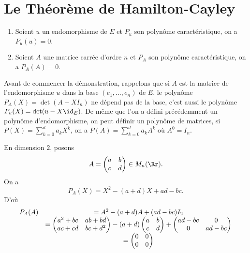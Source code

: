 \documentclass[class=report,crop=false]{standalone}
\begin{document}
\section{Le Théorème de Hamilton-Cayley}

\begin{theoreme}
\begin{enumerate}
  \item Soient $u$ un endomorphisme de $E$ et $P_u$ son polynôme caractéristique, on a
$P_u(u)=0$.
  \item Soient $A$ une matrice carrée d'ordre $n$ et $P_A$ son polynôme caractéristique, on a
$P_A(A)=0$.
\end{enumerate}
\end{theoreme}


Avant de commencer la démonstration, rappelons que si $A$ est la matrice de 
l'endomorphisme $u$ dans la base $(e_1,\dots,e_n)$ de $E$, 
le polynôme $P_A(X)=\det(A-XI_n)$ ne dépend pas de la base, c'est aussi le 
polynôme $P_u(X)=\det(u-X\id_E)$. De même que l'on a défini précédemment un 
polynôme d'endomorphisme, on peut définir un polynôme de matrices, si 
$P(X)=\sum_{k=0}^d a_kX^k$, on a
$P(A)=\sum_{k=0}^d a_kA^k$ où $A^0=I_n$. 

\begin{exemple}
En dimension $2$, posons $$A=\left(\begin{matrix}a&b\cr c&d\end{matrix}\right)\in M_n(\Rr).$$ On a 
$$P_A(X)=X^2-(a+d)X+ad-bc.$$
D'où $$\begin{array}{cc}P_A(A)&=A^2-(a+d)A+(ad-bc)I_2\cr&=\left(\begin{matrix}a^2+bc&ab+bd\cr ac+cd&bc+d^2\end{matrix}\right)-
(a+d)\left(\begin{matrix}a&b\cr c&d\end{matrix}\right)+\left(\begin{matrix}ad-bc&0\cr 0&ad-bc\end{matrix}\right)\cr&
=\left(\begin{matrix}0&0\cr 0&0\end{matrix}\right)\end{array}$$
\end{exemple} 
\end{document}
